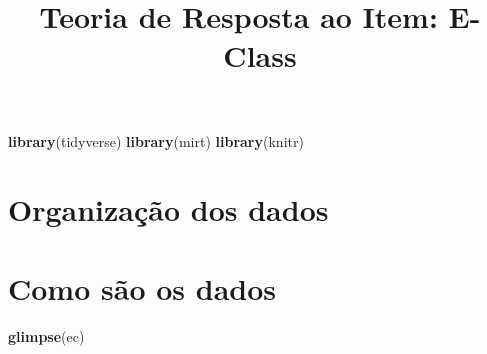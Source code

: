 \documentclass[]{article}
\title{Teoria de Resposta ao Item: E-Class}
\author{}
\date{}
\newenvironment{Shaded}{\begin{snugshade}}{\end{snugshade}}
\newcommand{\KeywordTok}[1]{\textcolor[rgb]{0.13,0.29,0.53}{\textbf{#1}}}
\newcommand{\StringTok}[1]{\textcolor[rgb]{0.31,0.60,0.02}{#1}}
\newcommand{\OperatorTok}[1]{\textcolor[rgb]{0.81,0.36,0.00}{\textbf{#1}}}
\newcommand{\NormalTok}[1]{#1}
\begin{document}
\maketitle

\begin{Shaded}
\begin{Highlighting}[]
\KeywordTok{library}\NormalTok{(tidyverse)}
\KeywordTok{library}\NormalTok{(mirt)}
\KeywordTok{library}\NormalTok{(knitr)}
\end{Highlighting}
\end{Shaded}

\section{Organização dos dados}\label{organizacao-dos-dados}

\begin{Shaded}
\end{Shaded}

\section{Como são os dados}\label{como-sao-os-dados}

\begin{Shaded}
\begin{Highlighting}[]
\KeywordTok{glimpse}\NormalTok{(ec)}
\end{Highlighting}
\end{Shaded}
\end{document}
